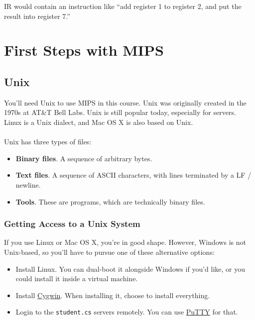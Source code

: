 \documentclass[]{article}
\theoremstyle{definition}
\newcommand{\lecture}[1]{\marginpar{{\footnotesize $\leftarrow$ \underline{#1}}}}
\begin{document}
				IR would contain an instruction like ``add register 1 to register 2, and put the result into register 7.''
	\section{First Steps with MIPS}
		\lecture{January 11, 2013}

		\subsection{Unix}
			You'll need Unix to use MIPS in this course. Unix was originally created in the 1970s at AT\&T Bell Labs. Unix is still popular today, especially for servers. Linux is a Unix dialect, and Mac OS X is also based on Unix. 
			\\ \\
			Unix has three types of files:
			\begin{itemize}
				\item \textbf{Binary files}. A sequence of arbitrary bytes.
				\item \textbf{Text files}. A sequence of ASCII characters, with lines terminated by a LF / newline.
				\item \textbf{Tools}. These are programs, which are technically binary files.
			\end{itemize}

			\subsubsection{Getting Access to a Unix System}
				If you use Linux or Mac OS X, you're in good shape. However, Windows is not Unix-based, so you'll have to pursue one of these alternative options:
				\begin{itemize}
				  	\item Install Linux. You can dual-boot it alongside Windows if you'd like, or you could install it inside a virtual machine.
				  	\item Install \href{http://www.cygwin.com/}{Cygwin}. When installing it, choose to install everything.
					\item Login to the \verb+student.cs+ servers remotely. You can use \href{http://www.putty.org/}{PuTTY} for that.
				\end{itemize}
\end{document}
